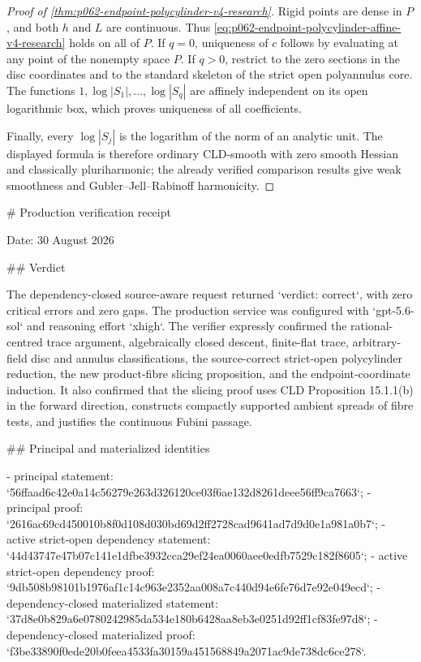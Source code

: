 \begin{proof}[Proof of \cref{thm:p062-endpoint-polycylinder-v4-research}]
Rigid points are dense in \(P\), and both \(h\) and \(L\) are continuous.
Thus \eqref{eq:p062-endpoint-polycylinder-affine-v4-research} holds on all
of \(P\).  If \(q=0\), uniqueness of \(c\) follows by evaluating at any
point of the nonempty space \(P\).  If \(q>0\), restrict to the zero
sections in the disc coordinates and to the standard skeleton of the
strict open polyannulus core.  The functions
\(1,\log|S_1|,\ldots,\log|S_q|\) are affinely independent on its open
logarithmic box, which proves uniqueness of all coefficients.

Finally, every \(\log|S_j|\) is the logarithm of the norm of an analytic
unit.  The displayed formula is therefore ordinary CLD-smooth with zero
smooth Hessian and classically pluriharmonic; the already verified
comparison results give weak smoothness and Gubler--Jell--Rabinoff
harmonicity.
\end{proof}

# Production verification receipt

Date: 30 August 2026

## Verdict

The dependency-closed source-aware request returned `verdict: correct`, with
zero critical errors and zero gaps.  The production service was configured
with `gpt-5.6-sol` and reasoning effort `xhigh`.  The verifier expressly
confirmed the rational-centred trace argument, algebraically closed descent,
finite-flat trace, arbitrary-field disc and annulus classifications, the
source-correct strict-open polycylinder reduction, the new product-fibre
slicing proposition, and the endpoint-coordinate induction.  It also
confirmed that the slicing proof uses CLD Proposition 15.1.1(b) in the
forward direction, constructs compactly supported ambient spreads of fibre
tests, and justifies the continuous Fubini passage.

## Principal and materialized identities

- principal statement:
  `56ffaad6c42e0a14c56279e263d326120ce03f6ae132d8261deee56ff9ca7663`;
- principal proof:
  `2616ac69cd450010b8f0d108d030bd69d2ff2728cad9641ad7d9d0e1a981a0b7`;
- active strict-open dependency statement:
  `44d43747e47b07c141e1dfbe3932cca29ef24ea0060aee0edfb7529c182f8605`;
- active strict-open dependency proof:
  `9db508b98101b1976af1c14c963e2352aa008a7c440d94e6fe76d7e92e049ecd`;
- dependency-closed materialized statement:
  `37d8e0b829a6e0780242985da534e180b6428aa8eb3e0251d92ff1cf83fe97d8`;
- dependency-closed materialized proof:
  `f3be33890f0ede20b0feea4533fa30159a451568849a2071ac9de738dc6ce278`.


